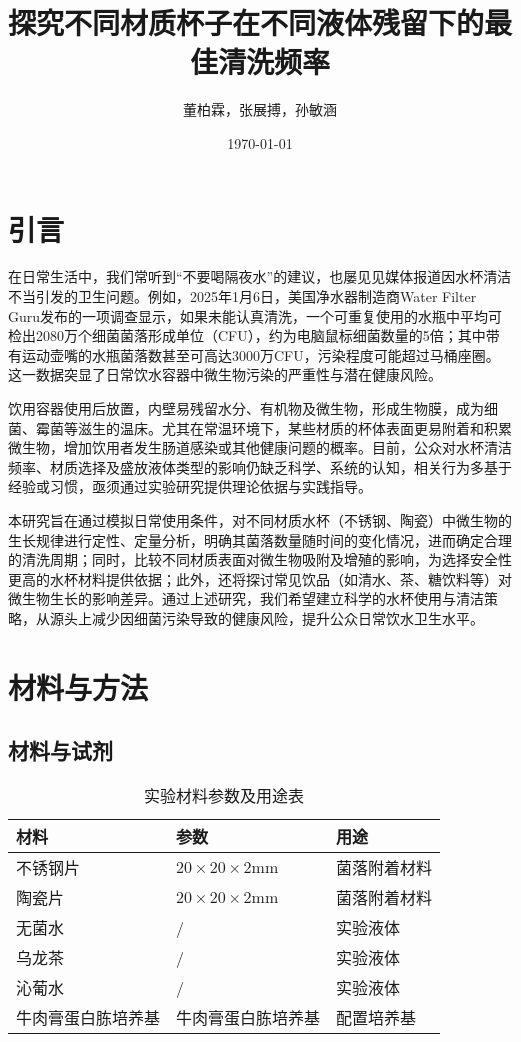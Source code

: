 \documentclass[12pt,a4paper]{ctexart}
\title{探究不同材质杯子在不同液体残留下的最佳清洗频率}
\author{董柏霖，张展搏，孙敏涵}
\date{\today}  %
\begin{document}
\maketitle  %

\begin{abstract}

\end{abstract}
\newpage
\tableofcontents
\newpage

\section{引言}
在日常生活中，我们常听到“不要喝隔夜水”的建议，也屡见见媒体报道因水杯清洁不当引发的卫生问题。例如，2025年1月6日，美国净水器制造商Water Filter Guru发布的一项调查显示，如果未能认真清洗，一个可重复使用的水瓶中平均可检出2080万个细菌菌落形成单位（CFU），约为电脑鼠标细菌数量的5倍；其中带有运动壶嘴的水瓶菌落数甚至可高达3000万CFU，污染程度可能超过马桶座圈。这一数据突显了日常饮水容器中微生物污染的严重性与潜在健康风险。

饮用容器使用后放置，内壁易残留水分、有机物及微生物，形成生物膜，成为细菌、霉菌等滋生的温床。尤其在常温环境下，某些材质的杯体表面更易附着和积累微生物，增加饮用者发生肠道感染或其他健康问题的概率。目前，公众对水杯清洁频率、材质选择及盛放液体类型的影响仍缺乏科学、系统的认知，相关行为多基于经验或习惯，亟须通过实验研究提供理论依据与实践指导。

本研究旨在通过模拟日常使用条件，对不同材质水杯（不锈钢、陶瓷）中微生物的生长规律进行定性、定量分析，明确其菌落数量随时间的变化情况，进而确定合理的清洗周期；同时，比较不同材质表面对微生物吸附及增殖的影响，为选择安全性更高的水杯材料提供依据；此外，还将探讨常见饮品（如清水、茶、糖饮料等）对微生物生长的影响差异。通过上述研究，我们希望建立科学的水杯使用与清洁策略，从源头上减少因细菌污染导致的健康风险，提升公众日常饮水卫生水平。


\section{材料与方法}
\subsection{材料与试剂}
\begin{table}[htbp]
  \centering
  \begin{tabular}{|l|l|l|}
    \hline
    材料 & 参数 & 用途 \\
    \hline
    不锈钢片 & \(20\times20\times2\mathrm{mm}\) & 菌落附着材料 \\
    \hline
    陶瓷片 & \(20\times20\times2\mathrm{mm}\) & 菌落附着材料 \\
    \hline
    无菌水 & / & 实验液体 \\
    \hline
    乌龙茶 & / & 实验液体 \\
    \hline
    沁葡水 & / & 实验液体 \\
    \hline
    牛肉膏蛋白胨培养基 & 牛肉膏蛋白胨培养基 & 配置培养基 \\
    \hline
  \end{tabular}
  \caption{实验材料参数及用途表}
  \label{tab:material}
\end{table}
\end{document}
